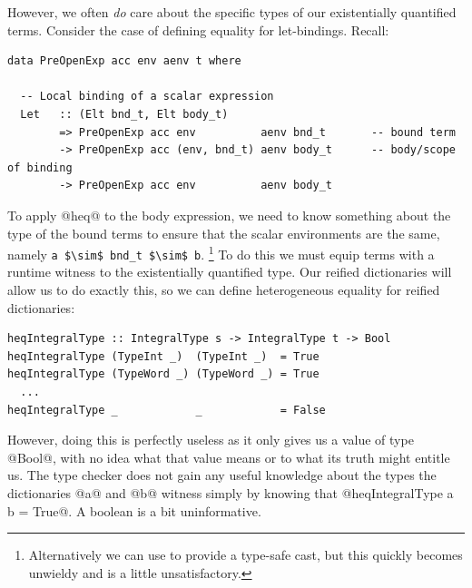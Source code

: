 However, we often \emph{do} care about the specific types of our existentially
quantified terms. Consider the case of defining equality for let-bindings.
Recall:
%
\begin{lstlisting}[style=haskell]
data PreOpenExp acc env aenv t where

  -- Local binding of a scalar expression
  Let   :: (Elt bnd_t, Elt body_t)
        => PreOpenExp acc env          aenv bnd_t       -- bound term
        -> PreOpenExp acc (env, bnd_t) aenv body_t      -- body/scope of binding
        -> PreOpenExp acc env          aenv body_t
\end{lstlisting}
%
To apply @heq@ to the body expression, we need to know something about
the type of the bound terms to ensure that the scalar environments are the same,
namely \lstinline[style=inline,mathescape]{a $\sim$ bnd_t $\sim$ b}.%
\footnote{Alternatively we can use  to provide a
type-safe cast, but this quickly becomes unwieldy and is a little
unsatisfactory.} To do this we must equip terms with a runtime witness to the
existentially quantified type. Our reified dictionaries will allow us to do
exactly this, so we can define heterogeneous equality for reified dictionaries:
%
\begin{lstlisting}[style=haskell]
heqIntegralType :: IntegralType s -> IntegralType t -> Bool
heqIntegralType (TypeInt _)  (TypeInt _)  = True
heqIntegralType (TypeWord _) (TypeWord _) = True
  ...
heqIntegralType _            _            = False
\end{lstlisting}
%
However, doing this is perfectly useless as it only gives us a value of type
@Bool@, with no idea what that value means or to what its truth might
entitle us. The type checker does not gain any useful knowledge about the types
the dictionaries @a@ and @b@ witness simply by knowing that
@heqIntegralType a b = True@. A boolean is a bit uninformative.

